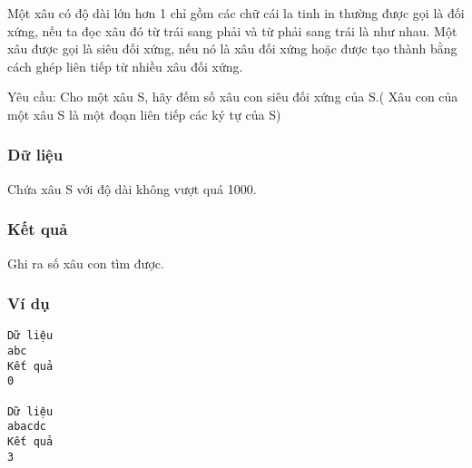 



   Một xâu có độ dài lớn hơn 1 chỉ gồm các chữ cái la tinh in thường được gọi là đối xứng, nếu ta đọc xâu đó từ trái sang phải và từ phải sang trái là như nhau. Một xâu được gọi là siêu đối xứng, nếu nó là xâu đối xứng hoặc được tạo thành bằng cách ghép liên tiếp từ nhiều xâu đối xứng.  

   Yêu cầu: Cho một xâu S, hãy đếm số xâu con siêu đối xứng của S.( Xâu con của một xâu S là một đoạn liên tiếp các ký tự của S)  

\subsubsection{   Dữ liệu  }

   Chứa xâu S với độ dài không vượt quá 1000.  

\subsubsection{   Kết quả  }

   Ghi ra số xâu con tìm được.  

\subsubsection{   Ví dụ  }
\begin{verbatim}
Dữ liệu
abc	
Kết quả
0

Dữ liệu
abacdc	
Kết quả
3
\end{verbatim}